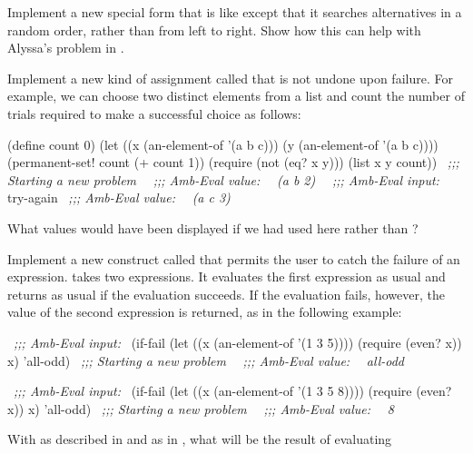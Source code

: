\begin{exerciseGroup}
\label{Exercise 4.50}
 Implement a new special form
 that is like  except that it searches alternatives in a
random order, rather than from left to right.  Show how this can help with
Alyssa's problem in .

\label{Exercise 4.51}
 Implement a new kind of
assignment called  that is not undone upon failure.  For
example, we can choose two distinct elements from a list and count the number
of trials required to make a successful choice as follows:

\begin{codeBlock}
(define count 0)
(let ((x (an-element-of '(a b c)))
      (y (an-element-of '(a b c))))
  (permanent-set! count (+ count 1))
  (require (not (eq? x y)))
  (list x y count))
~\textit{;;; Starting a new problem}~
~\textit{;;; Amb-Eval value:}~
~\textit{(a b 2)}~
~\textit{;;; Amb-Eval input:}~
try-again
~\textit{;;; Amb-Eval value:}~
~\textit{(a c 3)}~
\end{codeBlock}

What values would have been displayed if we had used  here
rather than  ?

\label{Exercise 4.52}
 Implement a new construct called
 that permits the user to catch the failure of an expression.
 takes two expressions.  It evaluates the first expression as
usual and returns as usual if the evaluation succeeds.  If the evaluation
fails, however, the value of the second expression is returned, as in the
following example:

\begin{codeBlock}
~\textit{;;; Amb-Eval input:}~
(if-fail (let ((x (an-element-of '(1 3 5))))
           (require (even? x))
           x)
         'all-odd)
~\textit{;;; Starting a new problem}~
~\textit{;;; Amb-Eval value:}~
~\textit{all-odd}~

~\textit{;;; Amb-Eval input:}~
(if-fail (let ((x (an-element-of '(1 3 5 8))))
           (require (even? x))
           x)
         'all-odd)
~\textit{;;; Starting a new problem}~
~\textit{;;; Amb-Eval value:}~
~\textit{8}~
\end{codeBlock}

\label{Exercise 4.53}
 With  as
described in  and  as in
, what will be the result of evaluating


\end{exerciseGroup}
